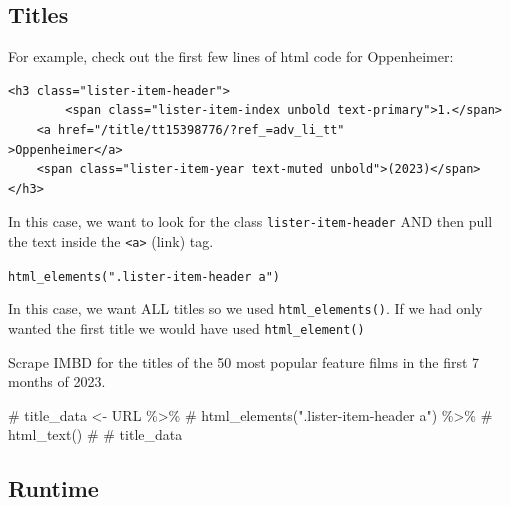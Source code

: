 \documentclass[
  letterpaper,
  DIV=11,
  numbers=noendperiod]{scrartcl}
\newenvironment{Shaded}{\begin{snugshade}}{\end{snugshade}}
\newcommand{\CommentTok}[1]{\textcolor[rgb]{0.37,0.37,0.37}{#1}}
\begin{document}
\hypertarget{titles}{%
\subsection{Titles}\label{titles}}

For example, check out the first few lines of html code for Oppenheimer:

\begin{verbatim}
<h3 class="lister-item-header">
        <span class="lister-item-index unbold text-primary">1.</span>
    <a href="/title/tt15398776/?ref_=adv_li_tt"
>Oppenheimer</a>
    <span class="lister-item-year text-muted unbold">(2023)</span>
</h3>
\end{verbatim}

In this case, we want to look for the class \texttt{lister-item-header}
AND then pull the text inside the \texttt{\textless{}a\textgreater{}}
(link) tag.

\texttt{html\_elements(".lister-item-header\ a")}

\begin{tcolorbox}[enhanced jigsaw, arc=.35mm, left=2mm, colbacktitle=quarto-callout-tip-color!10!white, coltitle=black, leftrule=.75mm, rightrule=.15mm, opacitybacktitle=0.6, titlerule=0mm, colframe=quarto-callout-tip-color-frame, toptitle=1mm, breakable, bottomtitle=1mm, bottomrule=.15mm, opacityback=0, title=\textcolor{quarto-callout-tip-color}{\faLightbulb}\hspace{0.5em}{Tip}, toprule=.15mm, colback=white]

In this case, we want ALL titles so we used \texttt{html\_elements()}.
If we had only wanted the first title we would have used
\texttt{html\_element()}

\end{tcolorbox}

Scrape IMBD for the titles of the 50 most popular feature films in the
first 7 months of 2023.

\begin{Shaded}
\begin{Highlighting}[]
\CommentTok{\# title\_data \textless{}{-} URL \%\textgreater{}\%}
\CommentTok{\#   html\_elements(".lister{-}item{-}header a") \%\textgreater{}\%}
\CommentTok{\#   html\_text()}
\CommentTok{\# }
\CommentTok{\# title\_data}
\end{Highlighting}
\end{Shaded}

\hypertarget{runtime}{%
\subsection{Runtime}\label{runtime}}
\end{document}
